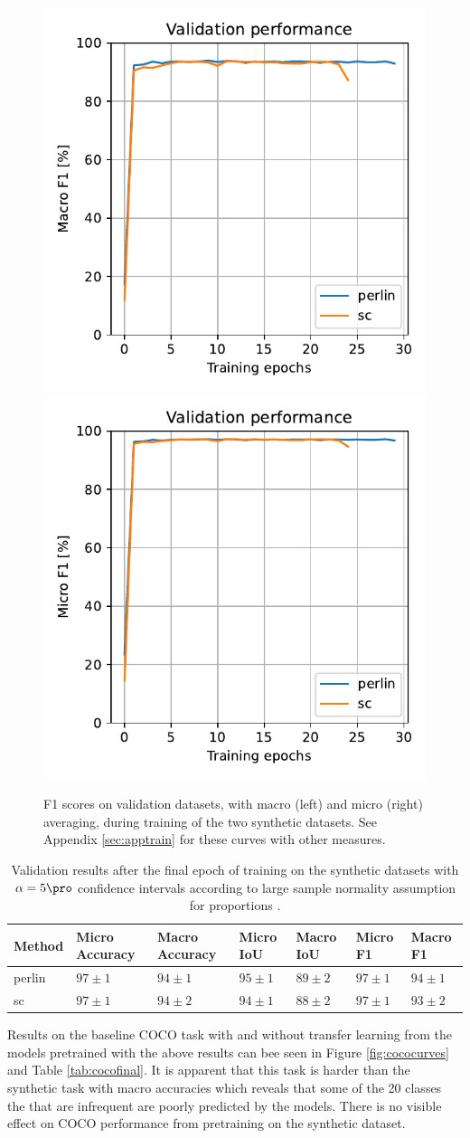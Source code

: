 \documentclass[12pt,fleqn]{article}
\begin{document}
\begin{figure}[H]
    \centering
        \includegraphics[width=.49\linewidth]{fb/Macro F1}
        \includegraphics[width=.49\linewidth]{fb/Micro F1}
    \caption{
        F1 scores on validation datasets, with macro (left) and micro (right) averaging, during training of the two synthetic datasets. See Appendix \ref{sec:apptrain} for these curves with other measures.
    }
    \label{fig:fbcurves}
\end{figure}\noindent


\begin{table}[H]
    \small
    \centering
    \begin{tabular}{l|llllll}
            Method & Micro Accuracy & Macro Accuracy & Micro IoU & Macro IoU & Micro F1 & Macro F1 \\
            \hline
            perlin & $97 \pm 1$ & $94 \pm 1$ & $95 \pm 1$ & $89 \pm 2$ & $97 \pm 1$ & $94 \pm 1$ \\
            sc & $97 \pm 1$ & $94 \pm 2$ & $94 \pm 1$ & $88 \pm 2$ & $97 \pm 1$ & $93 \pm 2$ \\
    \end{tabular}
    \caption{
        Validation results after the final epoch of training on the synthetic datasets with $\alpha=5\pro$ confidence intervals according to large sample normality assumption for proportions \cite[Method 7.3]{brock2015intro}.
    }
    \label{tab:fbfinal}
\end{table}\noindent
Results on the baseline COCO task with and without transfer learning from the models pretrained with the above results can bee seen in Figure \ref{fig:cococurves} and Table \ref{tab:cocofinal}.
It is apparent that this task is harder than the synthetic task with macro accuracies which reveals that some of the 20 classes the that are infrequent are poorly predicted by the models.
There is no visible effect on COCO performance from pretraining on the synthetic dataset.
\end{document}
